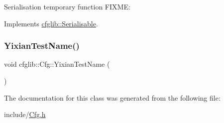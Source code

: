 Serialisation temporary function F\+I\+X\+ME\+: 

Implements \hyperlink{classcfglib_1_1Serialisable_aaeb80cc7397ad312e5ae34f39412ce42}{cfglib\+::\+Serialisable}.

\mbox{\label{classcfglib_1_1Cfg_ad939d89b58f8de319335e307069ae2ab}} 
\subsubsection{\texorpdfstring{Yixian\+Test\+Name()}{YixianTestName()}}
{\footnotesize\ttfamily void cfglib\+::\+Cfg\+::\+Yixian\+Test\+Name (\begin{DoxyParamCaption}{ }\end{DoxyParamCaption})}



The documentation for this class was generated from the following file\+:\begin{DoxyCompactItemize}
\item 
include/\hyperlink{Cfg_8h}{Cfg.\+h}\end{DoxyCompactItemize}
